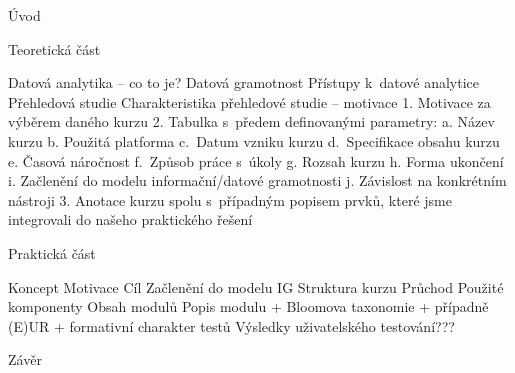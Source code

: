 Úvod

Teoretická část

Datová analytika -- co to je? Datová gramotnost Přístupy k~datové
analytice Přehledová studie Charakteristika přehledové studie --
motivace 1. Motivace za výběrem daného kurzu 2. Tabulka s~předem
definovanými parametry: a. Název kurzu b. Použitá platforma c.~Datum
vzniku kurzu d.~Specifikace obsahu kurzu e. Časová náročnost f.~Způsob
práce s~úkoly g. Rozsah kurzu h. Forma ukončení i. Začlenění do modelu
informační/datové gramotnosti j. Závislost na konkrétním nástroji 3.
Anotace kurzu spolu s~případným popisem prvků, které jsme integrovali do
našeho praktického řešení

Praktická část

Koncept Motivace Cíl Začlenění do modelu IG Struktura kurzu Průchod
Použité komponenty Obsah modulů Popis modulu + Bloomova taxonomie +
případně (E)UR + formativní charakter testů Výsledky uživatelského
testování???

Závěr
